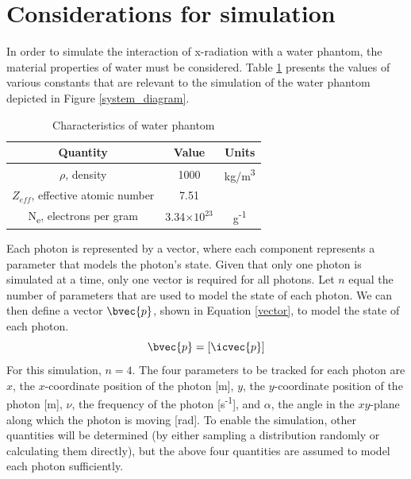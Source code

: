 \documentclass[12pt]{article} %
\providecommand{\e}[1]{\ensuremath{\times 10^{#1}}}
\begin{document}
\section*{Considerations for simulation}
In order to simulate the interaction of x-radiation with a water phantom, the material properties of water must be considered. Table \ref{water_values} presents the values of various constants \cite[p.~142]{johns1983} that are relevant to the simulation of the water phantom depicted in Figure \ref{system_diagram}. 

\begin{table}[h]
\caption{Characteristics of water phantom}
\centering
\begin{tabular}{ c c c }
\hline\hline
  \textbf{Quantity} & \textbf{Value} & \textbf{Units} \\
  \hline
  $\rho$, density & 1000 & kg/m\textsuperscript{3} \\
  $Z_{eff}$, effective atomic number & 7.51 & \\
  N\textsubscript{e}, electrons per gram & 3.34\e{23} & g\textsuperscript{-1}\\
\end{tabular}
\label{water_values}
\end{table}

Each photon is represented by a vector, where each component represents a parameter that models the photon's state.
Given that only one photon is simulated at a time, only one vector is required for all photons.
Let $n$ equal the number of parameters that are used to model the state of each photon. 
We can then define a vector $\bvec{p}$, shown in Equation \ref{vector}, to model the state of each photon.
\begin{equation}
\bvec{p} = \left[\icvec{p}\right]
\label{vector}
\end{equation}
For this simulation, $n=4$. The four parameters to be tracked for each photon are $x$, the $x$\nobreakdash-coordinate position of the photon [m], $y$, the $y$\nobreakdash-coordinate position of the photon [m], $\nu$, the frequency of the photon [s\textsuperscript{-1}], and $\alpha$, the angle in the $xy$\nobreakdash-plane along which the photon is moving [rad]. To enable the simulation, other quantities will be determined (by either sampling a distribution randomly or calculating them directly), but the above four quantities are assumed to model each photon sufficiently.
\end{document}

